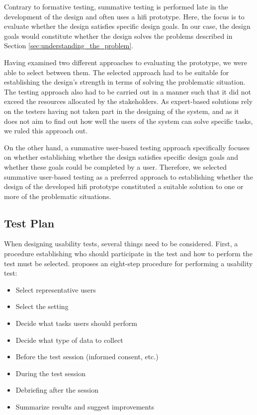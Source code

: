 Contrary to formative testing, summative testing is performed late in the development of the design and often uses a hifi prototype.
Here, the focus is to evaluate whether the design satisfies specific design goals. \cite{dumasAndFox_formative_usability_testing}
In our case, the design goals would constitute whether the design solves the problems described in Section \ref{sec:understanding_the_problem}.


Having examined two different approaches to evaluating the prototype, we were able to select between them.
The selected approach had to be suitable for establishing the design's strength in terms of solving the problematic situation.
The testing approach also had to be carried out in a manner such that it did not exceed the resources allocated by the stakeholders. 
As expert-based solutions rely on the testers having not taken part in the designing of the system, and as it does not aim to find out how well the users of the system can solve specific tasks, we ruled this approach out.

On the other hand, a summative user-based testing approach specifically focuses on whether establishing whether the design satisfies specific design goals and whether these goals could be completed by a user. 
Therefore, we selected summative user-based testing as a preferred approach to establishing whether the design of the developed hifi prototype constituted a suitable solution to one or more of the problematic situations. 

\subsection{Test Plan}\label{sec:prototype_test_plan}
When designing usability tests, several things need to be considered.
First, a procedure establishing who should participate in the test and how to perform the test must be selected.
\citeauthor{lazar2005web} \cite{lazar2005web,researchmethodsinhumancomputerinteraction} proposes an eight-step procedure for performing a usability test:
\begin{itemize}
\item Select representative users
\item Select the setting
\item Decide what tasks users should perform
\item Decide what type of data to collect
\item Before the test session (informed consent, etc.)
\item During the test session
\item Debriefing after the session
\item Summarize results and suggest improvements
\end{itemize}

